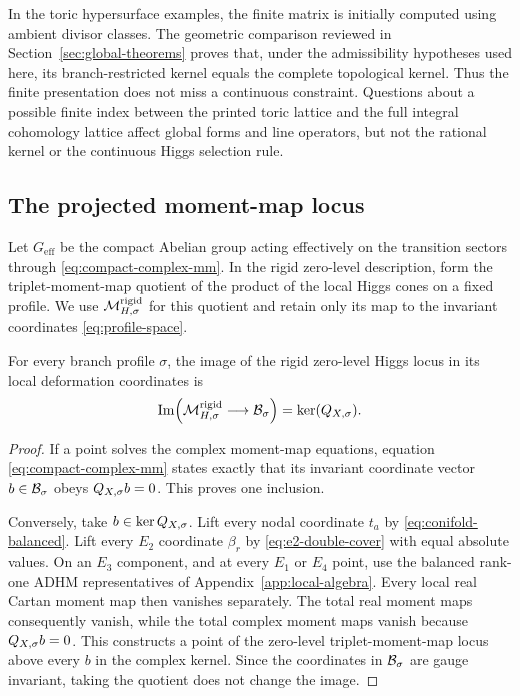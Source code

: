 In the toric hypersurface examples, the finite matrix is initially computed
using ambient divisor classes. The geometric comparison reviewed in
Section~\ref{sec:global-theorems} proves that, under the admissibility
hypotheses used here, its branch-restricted kernel equals the complete
topological kernel. Thus the finite presentation does not miss a continuous
constraint. Questions about a possible finite index between the printed toric
lattice and the full integral cohomology lattice affect global forms and line
operators, but not the rational kernel or the continuous Higgs selection rule.

\subsection{The projected moment-map locus}
\label{subsec:projected-locus}

Let $G_{\mathrm{eff}}$ be the compact Abelian group acting effectively on the
transition sectors through \eqref{eq:compact-complex-mm}. In the rigid
zero-level description, form the triplet-moment-map quotient of the product of
the local Higgs cones on a fixed profile. We use
$\mathcal M_{H,\sigma}^{\mathrm{rigid}}$ for this quotient and retain only its map to
the invariant coordinates \eqref{eq:profile-space}.

\begin{proposition}
\label{prop:physical-kernel}
For every branch profile $\sigma$, the image of the rigid zero-level Higgs
locus in its local deformation coordinates is
\begin{equation}
 \operatorname{Im}\!\left(
 \mathcal M_{H,\sigma}^{\mathrm{rigid}}\longrightarrow\mathcal B_{\sigma}
 \right)
 =\ker(Q_{X,\sigma}).
 \label{eq:physical-kernel}
\end{equation}
\end{proposition}

\begin{proof}
If a point solves the complex moment-map equations, equation
\eqref{eq:compact-complex-mm} states exactly that its invariant coordinate
vector $b\in\mathcal B_{\sigma}$ obeys $Q_{X,\sigma} b=0$. This proves one inclusion.

Conversely, take $b\in\ker Q_{X,\sigma}$. Lift every nodal coordinate $t_a$ by
\eqref{eq:conifold-balanced}. Lift every $E_2$ coordinate $\beta_r$ by
\eqref{eq:e2-double-cover} with equal absolute values. On an $E_3$ component,
and at every $E_1$ or $E_4$ point, use the balanced rank-one ADHM
representatives of Appendix~\ref{app:local-algebra}. Every local real Cartan moment map then vanishes
separately. The total real moment maps consequently vanish, while the total
complex moment maps vanish because $Q_{X,\sigma} b=0$. This constructs a point
of the zero-level triplet-moment-map locus above every $b$ in the complex
kernel. Since the coordinates in $\mathcal B_{\sigma}$ are gauge invariant, taking
the quotient does not change the image.
\end{proof}

